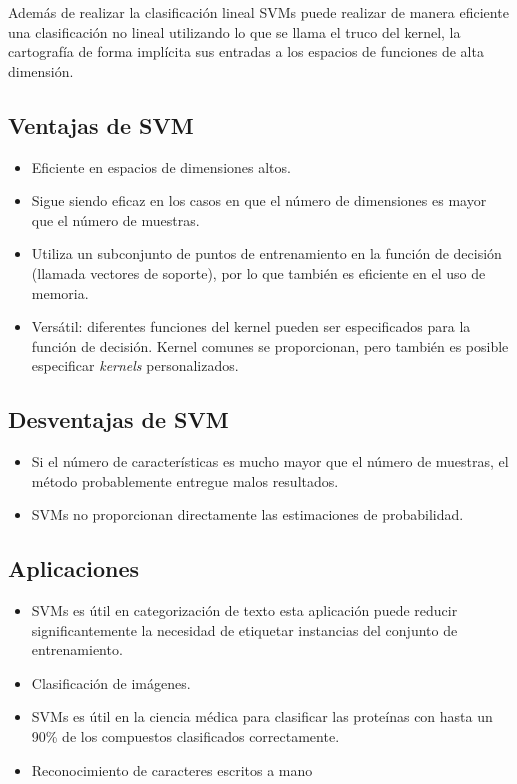 Además de realizar la clasificación lineal SVMs puede realizar de manera eficiente una clasificación no lineal utilizando lo que se llama el truco del kernel, la cartografía de forma implícita sus entradas a los espacios de funciones de alta dimensión.

\subsection{Ventajas de SVM}
\begin{itemize}
\item Eficiente en espacios de dimensiones altos.
\item Sigue siendo eficaz en los casos en que el número de dimensiones es mayor que el número de muestras.
\item Utiliza un subconjunto de puntos de entrenamiento en la función de decisión (llamada vectores de soporte), por lo que también es eficiente en el uso de memoria.
\item Versátil: diferentes funciones del kernel pueden ser especificados para la función de decisión. Kernel comunes se proporcionan, pero también es posible especificar \textit{kernels} personalizados.
\end{itemize}

\subsection{Desventajas de SVM}
\begin{itemize}
\item Si el número de características es mucho mayor que el número de muestras, el método probablemente entregue malos resultados.
\item SVMs no proporcionan directamente las estimaciones de probabilidad.
\end{itemize}

\subsection{Aplicaciones}
\begin{itemize}
\item SVMs es útil en categorización de texto esta aplicación puede reducir significantemente la necesidad de etiquetar instancias del conjunto de entrenamiento.
\item Clasificación de imágenes. 
\item SVMs es útil en la ciencia médica para clasificar las proteínas con hasta un 90\% de los compuestos clasificados correctamente.
\item Reconocimiento de caracteres escritos a mano
\end{itemize}

